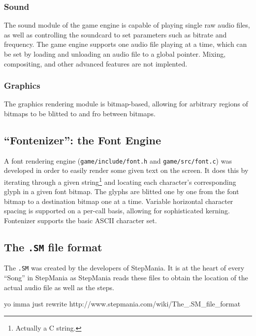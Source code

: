 	\subsubsection{Sound}
    The sound module of the game engine is capable of playing single raw audio files, as well as controlling the soundcard to set parameters such as bitrate and frequency.
    The game engine supports one audio file playing at a time, which can be set by loading and unloading an audio file to a global pointer.
    Mixing, compositing, and other advanced features are not implented.
	\subsubsection{Graphics}

    The graphics rendering module is bitmap-based, allowing for arbitrary regions of bitmaps to be blitted to and fro between bitmaps.


\subsection{``Fontenizer'': the Font Engine}
	A font rendering engine (\texttt{game/include/font.h} and \texttt{game/src/font.c}) was developed in order to easily render some given text on the screen.
	It does this by iterating through a given string\footnote{Actually a C string.} and locating each character's corresponding glyph in a given font bitmap.
	The glyphs are blitted one by one from the font bitmap to a destination bitmap one at a time.
    Variable horizontal character spacing is supported on a per-call basis, allowing for sophisticated kerning.
    Fontenizer supports the basic ASCII character set.
        
\subsection{The \texttt{.SM} file format}
The \texttt{.SM} was created by the developers of StepMania. It is at the heart of every ``Song'' in StepMania as StepMania reads these files to obtain the location of the actual audio file as well as the steps.

yo imma just rewrite http://www.stepmania.com/wiki/The_.SM_file_format
